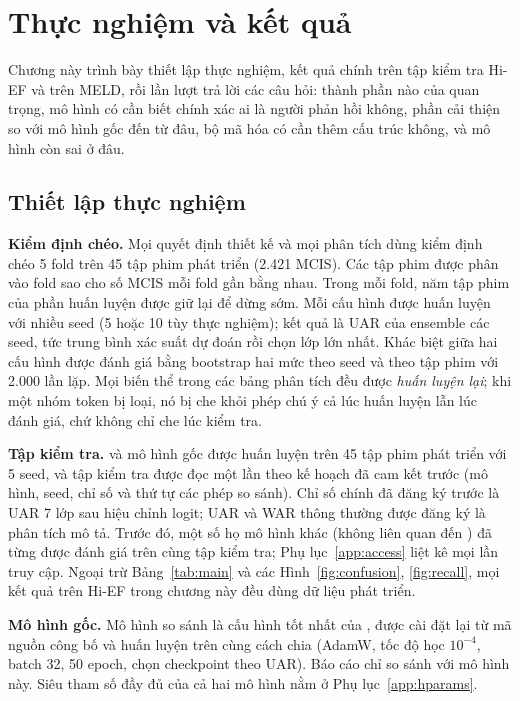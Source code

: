 \clearpage
{}
\chapter[THỰC NGHIỆM VÀ KẾT QUẢ]{Thực nghiệm và kết quả}
\label{chap:exp}

Chương này trình bày thiết lập thực nghiệm, kết quả chính trên tập kiểm tra Hi-EF và trên MELD, rồi lần lượt trả lời các câu hỏi: thành phần nào của \model{} quan trọng, mô hình có cần biết chính xác ai là người phản hồi không, phần cải thiện so với mô hình gốc đến từ đâu, bộ mã hóa có cần thêm cấu trúc không, và mô hình còn sai ở đâu.

\section{Thiết lập thực nghiệm}
\label{sec:thietlap}

\textbf{Kiểm định chéo.} Mọi quyết định thiết kế và mọi phân tích dùng kiểm định chéo 5 fold trên 45 tập phim phát triển (2.421 MCIS). Các tập phim được phân vào fold sao cho số MCIS mỗi fold gần bằng nhau. Trong mỗi fold, năm tập phim của phần huấn luyện được giữ lại để dừng sớm. Mỗi cấu hình được huấn luyện với nhiều seed (5 hoặc 10 tùy thực nghiệm); kết quả là UAR của ensemble các seed, tức trung bình xác suất dự đoán rồi chọn lớp lớn nhất. Khác biệt giữa hai cấu hình được đánh giá bằng bootstrap hai mức theo seed và theo tập phim với 2.000 lần lặp. Mọi biến thể trong các bảng phân tích đều được \emph{huấn luyện lại}; khi một nhóm token bị loại, nó bị che khỏi phép chú ý cả lúc huấn luyện lẫn lúc đánh giá, chứ không chỉ che lúc kiểm tra.

\textbf{Tập kiểm tra.} \model{} và mô hình gốc được huấn luyện trên 45 tập phim phát triển với 5 seed, và tập kiểm tra được đọc một lần theo kế hoạch đã cam kết trước (mô hình, seed, chỉ số và thứ tự các phép so sánh). Chỉ số chính đã đăng ký trước là UAR 7 lớp sau hiệu chỉnh logit; UAR và WAR thông thường được đăng ký là phân tích mô tả. Trước đó, một số họ mô hình khác (không liên quan đến \model{}) đã từng được đánh giá trên cùng tập kiểm tra; Phụ lục~\ref{app:access} liệt kê mọi lần truy cập. Ngoại trừ Bảng~\ref{tab:main} và các Hình~\ref{fig:confusion}, \ref{fig:recall}, mọi kết quả trên Hi-EF trong chương này đều dùng dữ liệu phát triển.

\textbf{Mô hình gốc.} Mô hình so sánh là cấu hình tốt nhất của \citet{wang2026hief}, được cài đặt lại từ mã nguồn công bố và huấn luyện trên cùng cách chia (AdamW, tốc độ học $10^{-4}$, batch 32, 50 epoch, chọn checkpoint theo UAR). Báo cáo chỉ so sánh với mô hình này. Siêu tham số đầy đủ của cả hai mô hình nằm ở Phụ lục~\ref{app:hparams}.

